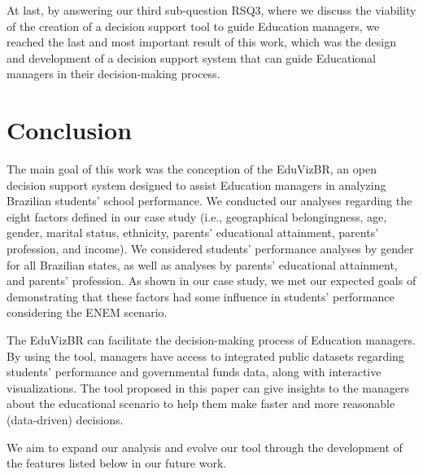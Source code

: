 \documentclass[12pt]{article}
\begin{document}
At last, by answering our third sub-question RSQ3, where we discuss the viability of the creation of a decision support tool to guide Education managers, we reached the last and most important result of this work, which was the design and development of a decision support system that can guide Educational managers in their decision-making process. 



\section{Conclusion}

The main goal of this work was the conception of the EduVizBR, an open decision support system designed to assist Education managers in analyzing Brazilian students' school performance.
We conducted our analyses regarding the eight factors defined in our case study (i.e., geographical belongingness, age, gender, marital status, ethnicity, parents' educational attainment, parents' profession, and income). We considered students' performance analyses by gender for all Brazilian states, as well as analyses by parents' educational attainment, and parents' profession. As shown in our case study, we met our expected goals of demonstrating that these factors had some influence in students' performance considering the ENEM scenario.

The EduVizBR can facilitate the decision-making process of Education managers. By using the tool, managers have access to integrated public datasets regarding students' performance and governmental funds data, along with interactive visualizations. The tool proposed in this paper can give insights to the managers about the educational scenario to help them make faster and more reasonable (data-driven) decisions.

We aim to expand our analysis and evolve our tool through the development of the features listed below in our future work.
\end{document}
